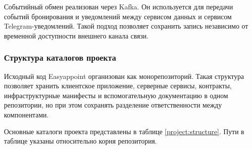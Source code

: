 Событийный обмен реализован через Kafka. Он используется для передачи событий бронирования и уведомлений между сервисом данных и сервисом Telegram-уведомлений. Такой подход позволяет сохранить запись независимо от временной доступности внешнего канала связи.

\subsubsection{Структура каталогов проекта}

Исходный код Easyappoint организован как монорепозиторий. Такая структура позволяет хранить клиентское приложение, серверные сервисы, контракты, инфраструктурные манифесты и вспомогательную документацию в одном репозитории, но при этом сохранять разделение ответственности между компонентами.

Основные каталоги проекта представлены в таблице \ref{project:structure}. Пути в таблице указаны относительно корня репозитория.

